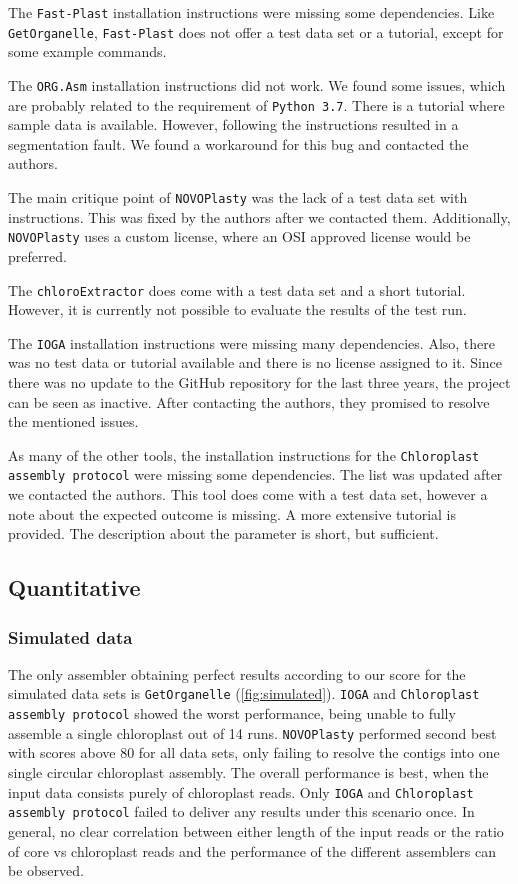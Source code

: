 \documentclass{bmcart}
\newcounter{todocounter}
\newcommand{\ak}[1]
{\stepcounter{todocounter}
 \todo[color=green!40,author=Arthur]{\thetodocounter: #1}
 }
\newcommand{\formatprogramnames}[1]{\texttt{#1}}
\newcommand{\ce}{\formatprogramnames{chloroExtractor}}
\newcommand{\oa}{\formatprogramnames{ORG.Asm}}
\newcommand{\fp}{\formatprogramnames{Fast-Plast}}
\newcommand{\ioga}{\formatprogramnames{IOGA}}
\newcommand{\np}{\formatprogramnames{NOVOPlasty}}
\newcommand{\go}{\formatprogramnames{GetOrganelle}}
\newcommand{\cassp}{\formatprogramnames{Chloroplast assembly protocol}}
\begin{document}
The \fp{} installation instructions were missing some dependencies.
Like \go{}, \fp{} does not offer a test data set or a tutorial, except for some example commands. 

The \oa{} installation instructions did not work.
We found some issues, which are probably related to the requirement of \texttt{Python~3.7}.
There is a tutorial where sample data is available.
However, following the instructions resulted in a segmentation fault.
We found a workaround for this bug and contacted the authors.

The main critique point of \np{} was the lack of a test data set with instructions.
This was fixed by the authors after we contacted them.
Additionally, \np{} uses a custom license, where an OSI approved license would be preferred.

The \ce{} does come with a test data set and a short tutorial.
However, it is currently not possible to evaluate the results of the test run.

The \ioga{} installation instructions were missing many dependencies.
Also, there was no test data or tutorial available and there is no license assigned to it.
Since there was no update to the GitHub repository for the last three years, the project can be seen as inactive.
After contacting the authors, they promised to resolve the mentioned issues.

As many of the other tools, the installation instructions for the \cassp{} were missing some dependencies.
The list was updated after we contacted the authors.
This tool does come with a test data set, however a note about the expected outcome is missing.
A more extensive tutorial is provided.
The description about the parameter is short, but sufficient.

\subsection*{Quantitative}
\subsubsection*{Simulated data}
The only assembler obtaining perfect results according to our score for the simulated data sets is \go{} (\cref{fig:simulated}).
\ioga{} and \cassp{} showed the worst performance, being unable to fully assemble a single chloroplast out of \num{14} runs.
\np{} performed second best with scores above \num{80} for all data sets, only failing to resolve the contigs into one single circular chloroplast assembly.
The overall performance \ak{of all assemblers ?} is best, when the input data consists purely of chloroplast reads.
Only \ioga{} and \cassp{} failed to deliver any results under this scenario once.
In general, no clear correlation between either length of the input reads or the ratio of core vs chloroplast reads and the performance of the different assemblers can be observed. 
\end{document}
